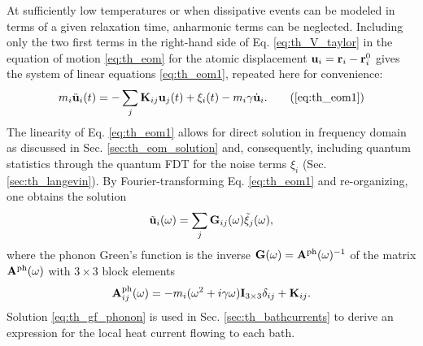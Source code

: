 At sufficiently low temperatures or when dissipative events can be modeled in terms of a given relaxation time, anharmonic terms can be neglected. Including only the two first terms in the right-hand side of Eq. \eqref{eq:th_V_taylor} in the equation of motion \eqref{eq:th_eom} for the atomic displacement $\mathbf{u}_i=\mathbf{r}_i-\mathbf{r}_i^0$ gives the system of linear equations \eqref{eq:th_eom1}, repeated here for convenience:
\begin{equation}
 m_i \ddot{\bu}_i(t) =  - \sum_j \bb{K}_{ij}\bb{u}_j(t) + \xi_i(t) - m_i \gamma \dot{\bu}_i.  \tag{\ref{eq:th_eom1}}
\end{equation}
The linearity of Eq. \eqref{eq:th_eom1} allows for direct solution in frequency domain as discussed in Sec. \ref{sec:th_eom_solution} and, consequently, including quantum statistics through the quantum FDT for the noise terms $\xi_i$ (Sec. \ref{sec:th_langevin}). By Fourier-transforming Eq. \eqref{eq:th_eom1} and re-organizing, one obtains the solution
 \begin{equation}
 \tilde {\mathbf{u}}_i(\omega) =  \sum_j \mathbf{G}_{ij}(\omega) \tilde{\xi}_j(\omega) , \label{eq:th_gf_phonon}
\end{equation}
where the phonon Green's function is the inverse $\mathbf{G}(\omega)=\mathbf{A}^{\textrm{ph}}(\omega)^{-1}$ of the matrix $\mathbf{A}^{\textrm{ph}}(\omega)$ with $3\times 3$ block elements
\begin{equation}
 \mathbf{A}_{ij}^{\textrm{ph}}(\omega)= -m_i(\omega^2+i\gamma\omega) \mathbf{I}_{3 \times 3} \delta_{ij} + \mathbf{K}_{ij} .
\end{equation}
Solution \eqref{eq:th_gf_phonon} is used in Sec. \ref{sec:th_bathcurrents} to derive an expression for the local heat current flowing to each bath.



